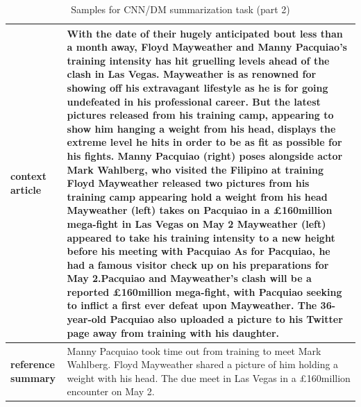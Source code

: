 \begin{table}[t]
\begin{center}
\caption*{Samples for CNN/DM summarization task (part 2)}
\begin{tabular}{|p{2cm}|p{12cm}|}

\hline
    
\hline
\textbf{context article}
&
\multicolumn{1}{|C{12cm}|}{ 
With the date of their hugely anticipated bout less than a month away, Floyd Mayweather and Manny Pacquiao's training intensity has hit gruelling levels ahead of the clash in Las Vegas.
\newline\newline
Mayweather is as renowned for showing off his extravagant lifestyle as he is for going undefeated in his professional career.
\newline\newline
But the latest pictures released from his training camp, appearing to show him hanging a weight from his head, displays the extreme level he hits in order to be as fit as possible for his fights.
\newline\newline
Manny Pacquiao (right) poses alongside actor Mark Wahlberg, who visited the Filipino at training
\newline\newline
Floyd Mayweather released two pictures from his training camp appearing hold a weight from his head
\newline\newline
Mayweather (left) takes on Pacquiao in a £160million mega-fight in Las Vegas on May 2
\newline\newline
Mayweather (left) appeared to take his training intensity to a new height before his meeting with Pacquiao
\newline\newline
As for Pacquiao, he had a famous visitor check up on his preparations for May 2.\newline{}\newline\newline Pacquiao and Mayweather's clash will be a reported £160million mega-fight, with Pacquiao seeking to inflict a first ever defeat upon Mayweather.
\newline\newline
The 36-year-old Pacquiao also uploaded a picture to his Twitter page away from training with his daughter.
}
\\
\hline
\textbf{reference summary}
&
Manny Pacquiao took time out from training to meet Mark Wahlberg. Floyd Mayweather shared a picture of him holding a weight with his head. The due meet in Las Vegas in a £160million encounter on May 2.
\\
\hline
\hline


\end{tabular}
\end{center}
\end{table}

